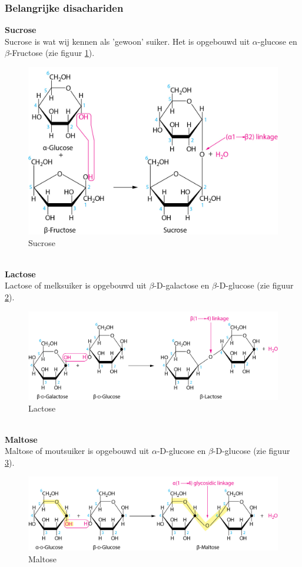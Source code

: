 \documentclass[a4paper,kul]{kulakarticle} %
\begin{document}
\subsubsection{Belangrijke disachariden}
\textbf{Sucrose}\\
Sucrose is wat wij kennen als 'gewoon' suiker. Het is opgebouwd uit $\alpha$-glucose en $\beta$-Fructose (zie figuur \ref{fig:sucrose}).
\begin{figure}[h]
	\centering
	\includegraphics[width=0.5\linewidth]{sucrose}
	\caption[Sucrose]{Sucrose}
	\label{fig:sucrose}
\end{figure}\\
\textbf{Lactose}\\
Lactose of melksuiker is opgebouwd uit $\beta$-D-galactose en $\beta$-D-glucose (zie figuur \ref{fig:lactose}).
\begin{figure}[h]
	\centering
	\includegraphics[width=0.6\linewidth]{Lactose}
	\caption[Lactose]{Lactose}
	\label{fig:lactose}
\end{figure}\\ 
\newpage 	
\textbf{Maltose}\\
Maltose of moutsuiker is opgebouwd uit $\alpha$-D-glucose en $\beta$-D-glucose (zie figuur \ref{fig:maltose}).
\begin{figure}[h]
	\centering
	\includegraphics[width=0.6\linewidth]{Maltose}
	\caption[Maltose]{Maltose}
	\label{fig:maltose}
\end{figure}
\end{document}
